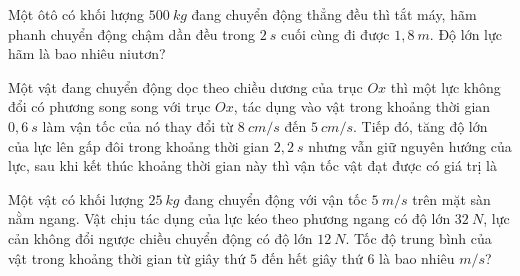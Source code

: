 \begin{ex}%
Một ôtô có khối lượng $500\ kg$ đang chuyển động thẳng đều thì tắt máy, hãm phanh chuyển động chậm dần đều trong $2\ s$ cuối cùng đi được $1,8\ m$. Độ lớn lực hãm là bao nhiêu niutơn?
  \end{ex}
\begin{ex}%
Một vật đang chuyển động dọc theo chiều dương của trục $Ox$ thì một lực không đổi có phương song song với trục $Ox$, tác dụng vào vật trong khoảng thời gian $0,6\ s$ làm vận tốc của nó thay đổi từ $8\ cm/s$ đến $5\ cm/s$. Tiếp đó, tăng độ lớn của lực lên gấp đôi trong khoảng thời gian $2,2\ s$ nhưng vẫn giữ nguyên hướng của lực, sau khi kết thúc khoảng thời gian này thì vận tốc vật đạt được có giá trị là
  \end{ex}
\begin{ex}%
Một vật có khối lượng $25\ kg$ đang chuyển động với vận tốc $5\ m/s$ trên mặt sàn nằm ngang. Vật chịu tác dụng của lực kéo theo phương ngang có độ lớn $32\ N$, lực cản không đổi ngược chiều chuyển động có độ lớn $12\ N$. Tốc độ trung bình của vật trong khoảng thời gian từ giây thứ $5$ đến hết giây thứ $6$ là bao nhiêu $m/s$?
\loigiai{}
\end{ex}








